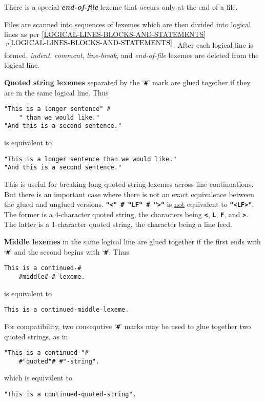 \documentclass[12pt]{article}
\newcommand{\TT}[1]{{\tt \bfseries #1}}
\newcommand{\emkey}[1]{{\em \bfseries #1}}
\newcommand{\ikey}[2]{{\rm \bfseries #1}}
\newcommand{\itemref}[1]{\ref{#1}$\,^{p\pageref{#1}}$}
\newenvironment{indpar}[1][0.3in]%
	{\begin{list}{}%
		     {\setlength{\itemsep}{0in}%
		      \setlength{\topsep}{0in}%
		      \setlength{\parsep}{1ex}%
		      \setlength{\labelwidth}{#1}%
		      \setlength{\leftmargin}{#1}%
		      \addtolength{\leftmargin}{\labelsep}}%
	 \item}%
	{\end{list}}
\begin{document}
There is a special \emkey{end-of-file}\label{END-OF-FILE}
lexeme that occurs only at the end of a file.

Files are scanned into sequences of lexemes which are then divided
into logical lines as per \itemref{LOGICAL-LINES-BLOCKS-AND-STATEMENTS}.
After each logical line is formed,
{\em indent}, {\em comment},
{\em line-break}, and {\em end-of-file} lexemes are deleted
from the logical line.

\ikey{Quoted string lexemes}{quoted strings!concatenated}
\label{QUOTED-STRING-CONCATENATION}
separated by the `\TT{\#}' mark
are glued together if they are in the
same logical line.  Thus
\begin{indpar}\begin{verbatim}
"This is a longer sentence" #
    " than we would like."
"And this is a second sentence."
\end{verbatim}\end{indpar}
is equivalent to
\begin{indpar}\begin{verbatim}
"This is a longer sentence than we would like."
"And this is a second sentence."
\end{verbatim}\end{indpar}
This is useful for
breaking long quoted string lexemes across line continuations.
But there is an important case where there is not an exact equivalence
between the glued and unglued versions.  \TT{"<" \# "LF" \# ">"} is
\underline{not} equivalent to \TT{"<LF>"}.  The former is a 4-character
quoted string, the characters being \TT{<}, \TT{L}, \TT{F},
and \TT{>}.  The latter is a 1-character quoted string, the character
being a line feed.

\ikey{Middle lexemes}{middle lexemes!glued}
in the same logical line are glued together if the first
ends with `\TT{\#}' and the second begins with `\TT{\#}'.
Thus
\begin{indpar}\begin{verbatim}
This is a continued-#
    #middle# #-lexeme.
\end{verbatim}\end{indpar}
is equivalent to
\begin{indpar}\begin{verbatim}
This is a continued-middle-lexeme.
\end{verbatim}\end{indpar}
For compatibility, two consequtive `\TT{\#}' marks may be used
to glue together two quoted strings, as in
\begin{indpar}\begin{verbatim}
"This is a continued-"#
    #"quoted"# #"-string".
\end{verbatim}\end{indpar}
which is equivalent to
\begin{indpar}\begin{verbatim}
"This is a continued-quoted-string".
\end{verbatim}\end{indpar}
\end{document}
